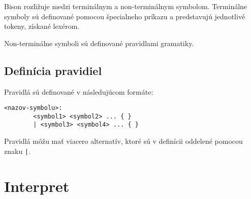 Bison rozližuje medzi terminálnym a non-terminálnym symbolom. Terminálne symboly sú definované pomocou špecialneho príkazu a predstavujú
jednotlivé tokeny, získané lexérom.

Non-terminálne symboli sú definované pravidlami gramatiky. 
\subsection{Definícia pravidiel}
Pravidlá sú definované v následujúcom formáte:

\begin{verbatim}
<nazov-symbolu>:
        <symbol1> <symbol2> ... { } 
        | <symbol3> <symbol4> ... { }
\end{verbatim}

Pravidlá môžu mať viacero alternatív, ktoré sú v definícii oddelené pomocou znaku \texttt{|}. 




\section{Interpret}

	
